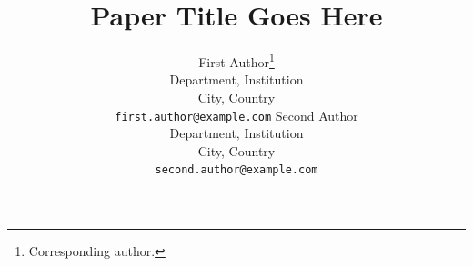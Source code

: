 \title{Paper Title Goes Here}

\author{%
  First Author\thanks{Corresponding author.} \\
  Department, Institution \\
  City, Country \\
  \texttt{first.author@example.com}
  \And
  Second Author \\
  Department, Institution \\
  City, Country \\
  \texttt{second.author@example.com}
}

\newcommand{\paperkeywords}{keyword one $\cdot$ keyword two $\cdot$ keyword three}

